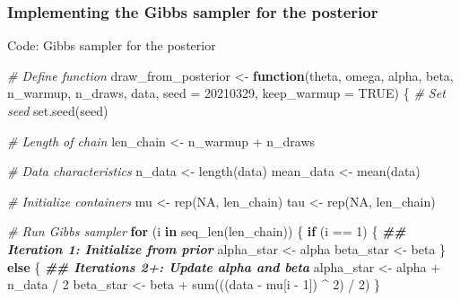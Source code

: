 \documentclass[
  11pt,
]{article}
\newenvironment{Shaded}{\begin{snugshade}}{\end{snugshade}}
\newcommand{\AttributeTok}[1]{\textcolor[rgb]{0.77,0.63,0.00}{#1}}
\newcommand{\CommentTok}[1]{\textcolor[rgb]{0.56,0.35,0.01}{\textit{#1}}}
\newcommand{\ConstantTok}[1]{\textcolor[rgb]{0.00,0.00,0.00}{#1}}
\newcommand{\ControlFlowTok}[1]{\textcolor[rgb]{0.13,0.29,0.53}{\textbf{#1}}}
\newcommand{\DecValTok}[1]{\textcolor[rgb]{0.00,0.00,0.81}{#1}}
\newcommand{\DocumentationTok}[1]{\textcolor[rgb]{0.56,0.35,0.01}{\textbf{\textit{#1}}}}
\newcommand{\FunctionTok}[1]{\textcolor[rgb]{0.00,0.00,0.00}{#1}}
\newcommand{\NormalTok}[1]{#1}
\newcommand{\OtherTok}[1]{\textcolor[rgb]{0.56,0.35,0.01}{#1}}
\newcommand{\SpecialCharTok}[1]{\textcolor[rgb]{0.00,0.00,0.00}{#1}}
\begin{document}
\hypertarget{implementing-the-gibbs-sampler-for-the-posterior}{%
\subsubsection{Implementing the Gibbs sampler for the posterior}\label{implementing-the-gibbs-sampler-for-the-posterior}}

Code: Gibbs sampler for the posterior

\begin{Shaded}
\begin{Highlighting}[]
\CommentTok{\# Define function}
\NormalTok{draw\_from\_posterior }\OtherTok{\textless{}{-}} \ControlFlowTok{function}\NormalTok{(theta,}
\NormalTok{                                omega,}
\NormalTok{                                alpha,}
\NormalTok{                                beta,}
\NormalTok{                                n\_warmup,}
\NormalTok{                                n\_draws,}
\NormalTok{                                data,}
                                \AttributeTok{seed =} \DecValTok{20210329}\NormalTok{,}
                                \AttributeTok{keep\_warmup =} \ConstantTok{TRUE}\NormalTok{) \{}
  \CommentTok{\# Set seed}
  \FunctionTok{set.seed}\NormalTok{(seed)}

  \CommentTok{\# Length of chain}
\NormalTok{  len\_chain }\OtherTok{\textless{}{-}}\NormalTok{ n\_warmup }\SpecialCharTok{+}\NormalTok{ n\_draws}
  
  \CommentTok{\# Data characteristics}
\NormalTok{  n\_data }\OtherTok{\textless{}{-}} \FunctionTok{length}\NormalTok{(data)  }
\NormalTok{  mean\_data }\OtherTok{\textless{}{-}} \FunctionTok{mean}\NormalTok{(data) }

  \CommentTok{\# Initialize containers}
\NormalTok{  mu }\OtherTok{\textless{}{-}} \FunctionTok{rep}\NormalTok{(}\ConstantTok{NA}\NormalTok{, len\_chain)}
\NormalTok{  tau }\OtherTok{\textless{}{-}} \FunctionTok{rep}\NormalTok{(}\ConstantTok{NA}\NormalTok{, len\_chain)}
  
  \CommentTok{\# Run Gibbs sampler}
  \ControlFlowTok{for}\NormalTok{ (i }\ControlFlowTok{in} \FunctionTok{seq\_len}\NormalTok{(len\_chain)) \{}
    \ControlFlowTok{if}\NormalTok{ (i }\SpecialCharTok{==} \DecValTok{1}\NormalTok{) \{}
      \DocumentationTok{\#\# Iteration 1: Initialize from prior}
\NormalTok{      alpha\_star }\OtherTok{\textless{}{-}}\NormalTok{ alpha}
\NormalTok{      beta\_star }\OtherTok{\textless{}{-}}\NormalTok{ beta}
\NormalTok{    \} }\ControlFlowTok{else}\NormalTok{ \{}
      \DocumentationTok{\#\# Iterations 2+: Update alpha and beta}
\NormalTok{      alpha\_star }\OtherTok{\textless{}{-}}\NormalTok{ alpha }\SpecialCharTok{+}\NormalTok{ n\_data }\SpecialCharTok{/} \DecValTok{2}
\NormalTok{      beta\_star }\OtherTok{\textless{}{-}}\NormalTok{ beta }\SpecialCharTok{+} \FunctionTok{sum}\NormalTok{(((data }\SpecialCharTok{{-}}\NormalTok{ mu[i }\SpecialCharTok{{-}} \DecValTok{1}\NormalTok{]) }\SpecialCharTok{\^{}} \DecValTok{2}\NormalTok{) }\SpecialCharTok{/} \DecValTok{2}\NormalTok{)}
\NormalTok{    \}}
    

\end{Highlighting}
\end{Shaded}
\end{document}
